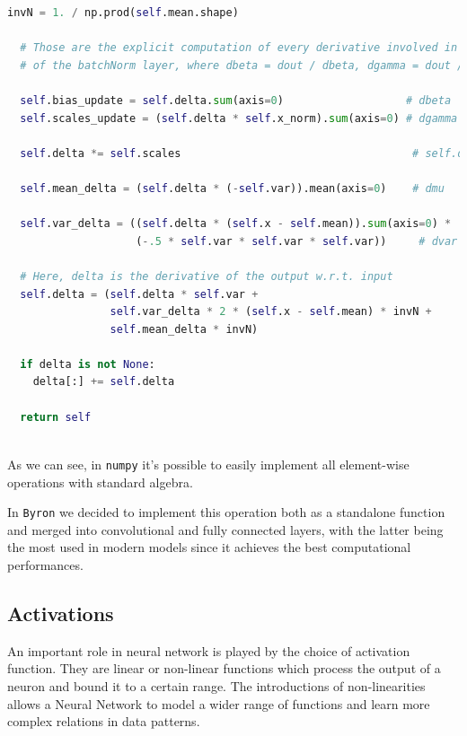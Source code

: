 \documentclass[12pt,a4paper]{report}
\begin{document}
\begin{lstlisting}[language=Python, caption=NumPyNet version of batchnorm function, label=code:py_batchnorm]
  invN = 1. / np.prod(self.mean.shape)

  # Those are the explicit computation of every derivative involved in BackPropagation
  # of the batchNorm layer, where dbeta = dout / dbeta, dgamma = dout / dgamma etc...

  self.bias_update = self.delta.sum(axis=0)                   # dbeta
  self.scales_update = (self.delta * self.x_norm).sum(axis=0) # dgamma

  self.delta *= self.scales                                    # self.delta = dx_norm from now on

  self.mean_delta = (self.delta * (-self.var)).mean(axis=0)    # dmu

  self.var_delta = ((self.delta * (self.x - self.mean)).sum(axis=0) *
                    (-.5 * self.var * self.var * self.var))     # dvar

  # Here, delta is the derivative of the output w.r.t. input
  self.delta = (self.delta * self.var +
                self.var_delta * 2 * (self.x - self.mean) * invN +
                self.mean_delta * invN)

  if delta is not None:
    delta[:] += self.delta

  return self
  
\end{lstlisting}

As we can see, in \texttt{numpy} it's possible to easily implement all element-wise operations with standard algebra.

In \texttt{Byron} we decided to implement this operation both as a standalone function and merged into convolutional and fully connected layers, with the latter being the most used in modern models since it achieves the best computational performances.

\subsection*{Activations}

An important role in neural network is played by the choice of activation function. They are linear or non-linear functions which process the output of a neuron and bound it to a certain range.
The introductions of non-linearities allows a Neural Network to model a wider range of functions and learn more complex relations in data patterns.
\end{document}
